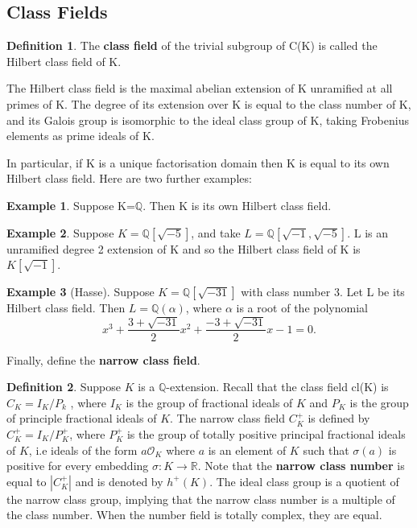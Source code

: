 \documentclass[12pt]{extarticle}
\newcommand{\Q}{\mathbb{Q}}
\newcommand{\<}{\langle}
\renewcommand{\>}{\rangle}
\theoremstyle{definition}
\newtheorem*{definition}{Definition}
\newtheorem*{example}{Example}
\begin{document}
\subsection{Class Fields}
\begin{definition}
The \textbf{class field} of the trivial subgroup of C(K) is called the Hilbert class field of K. 
\end{definition}
The Hilbert class field is the maximal abelian extension of K unramified at all primes of K. The degree of its extension over K is equal to the class number of K, and its Galois group is isomorphic to the ideal class group of K, taking Frobenius elements as prime ideals of K.\par
In particular, if K is a unique factorisation domain then K is equal to its own Hilbert class field. 
Here are two further examples:
\begin{example}
    Suppose K=$\mathbb{Q}$. Then K is its own Hilbert class field. 
\end{example}
\begin{example}
    Suppose $K=\mathbb{Q}[\sqrt{-5}]$, and take $L=\Q[\sqrt{-1},\sqrt{-5}]$. L is an unramified degree 2 extension of K and so the Hilbert class field of K is $K[\sqrt{-1}]$.
\end{example}
\begin{example}[Hasse]
    Suppose $K=\mathbb{Q}[\sqrt{-31}]$ with class number 3. Let L be its Hilbert class field. Then $L = \Q(\alpha)$, where $\alpha$ is a root of the polynomial 
    \begin{equation}
        x^3+\frac{3+\sqrt{-31}}{2}x^2+\frac{-3+\sqrt{-31}}{2}x -1 =0.
    \end{equation}
\end{example}

Finally, define the \textbf{narrow class field}.
\begin{definition}
Suppose $K$ is a $\Q$-extension. Recall that the class field cl(K) is $C_K = I_K/P_k$ , where $I_K$ is the group of fractional ideals of $K$ and $P_K$ is the group of principle fractional ideals of $K$. The narrow class field $C_K^{+}$ is defined by $C_K^{+} = I_K/P_K^{+}$, where $P_K^{+}$ is the group of totally positive principal fractional ideals of $K$, i.e ideals of the form $a\mathcal{O}_K$ where $a$ is an element of $K$ such that $\sigma(a)$ is positive for every embedding $\sigma: K \rightarrow \mathbb{R}$. 
Note that the \textbf{narrow class number} is equal to $|C_K^{+}|$ and is denoted by $h^{+}(K)$. 
  The ideal class group is a quotient of the narrow class group, implying that the narrow class number is a multiple of the class number. When the number field is totally complex, they are equal. 


\end{definition}
\end{document}
